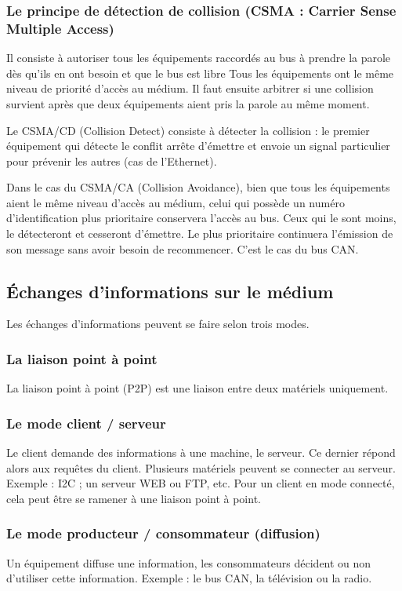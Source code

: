 \documentclass[10pt]{article}
\begin{document}
\subsubsection*{Le principe de détection de collision (CSMA : Carrier Sense Multiple Access)}
Il consiste à autoriser tous les équipements raccordés au bus à prendre la parole dès qu’ils en ont besoin et que le bus est libre Tous les équipements ont le même niveau de priorité d’accès au médium. Il faut ensuite arbitrer si une collision survient après que deux équipements aient pris la parole au même moment. 

Le CSMA/CD (Collision Detect) consiste à détecter la collision : le premier équipement qui détecte le conflit arrête d’émettre et envoie un signal particulier pour prévenir les autres (cas de l’Ethernet).

Dans le cas du CSMA/CA (Collision Avoidance), bien que tous les équipements aient le même niveau d’accès au médium, celui qui possède un numéro d’identification plus prioritaire conservera l’accès au bus. Ceux qui le sont moins, le détecteront et cesseront d’émettre. Le plus prioritaire continuera l’émission de son message sans avoir besoin de recommencer. C’est le cas du bus CAN.

\subsection{Échanges d’informations sur le médium}
Les échanges d’informations peuvent se faire selon trois modes.

\subsubsection*{La liaison point à point}
La liaison point à point (P2P) est une liaison entre deux matériels uniquement.

\subsubsection*{Le mode client / serveur}
Le client demande des informations à une machine, le serveur. Ce dernier répond alors aux requêtes du client. Plusieurs matériels peuvent se connecter au serveur. Exemple : I2C ; un serveur WEB ou FTP, etc. Pour un client en mode connecté, cela peut être se ramener à une liaison point à point.

\subsubsection*{Le mode producteur / consommateur (diffusion)}
Un équipement diffuse une information, les consommateurs décident ou non d’utiliser cette information. Exemple : le bus CAN, la télévision ou la radio.
\end{document}
